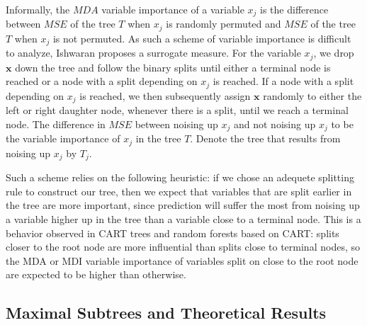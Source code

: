 \documentclass[12pt,twoside]{reedthesis}
\theoremstyle{definition}
\theoremstyle{definition}
\theoremstyle{definition}
\theoremstyle{remark}
\begin{document}
Informally, the \(MDA\) variable importance of a variable \(x_j\) is the
difference between \(MSE\) of the tree \(T\) when \(x_j\) is randomly
permuted and \(MSE\) of the tree \(T\) when \(x_j\) is not permuted. As
such a scheme of variable importance is difficult to analyze, Ishwaran
proposes a surrogate measure. For the variable \(x_j\), we drop
\(\mathbf{x}\) down the tree and follow the binary splits until either a
terminal node is reached or a node with a split depending on \(x_j\) is
reached. If a node with a split depending on \(x_j\) is reached, we then
subsequently assign \(\mathbf{x}\) randomly to either the left or right
daughter node, whenever there is a split, until we reach a terminal
node. The difference in \(MSE\) between noising up \(x_j\) and not
noising up \(x_j\) to be the variable importance of \(x_j\) in the tree
\(T\). Denote the tree that results from noising up \(x_j\) by \(T_j\).

Such a scheme relies on the following heuristic: if we chose an adequete
splitting rule to construct our tree, then we expect that variables that
are split earlier in the tree are more important, since prediction will
suffer the most from noising up a variable higher up in the tree than a
variable close to a terminal node. This is a behavior observed in CART
trees and random forests based on CART: splits closer to the root node
are more influential than splits close to terminal nodes, so the MDA or
MDI variable importance of variables split on close to the root node are
expected to be higher than otherwise.

\subsection{Maximal Subtrees and Theoretical
Results}\label{maximal-subtrees-and-theoretical-results}
\end{document}
